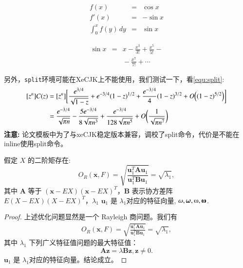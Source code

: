 \begin{eqnarray}
f(x) & = & \cos x \\ 
f'(x) & = & -\sin x \\ 
\int_{0}^{x} f(y)\,dy & = & \sin x 
\end{eqnarray} 

{\setlength\arraycolsep{2pt} 
\begin{eqnarray} 
\sin x & = & x -\frac{x^{3}}{3!} +\frac{x^{5}}{5!}-{} \nonumber\\ 
	& & {}-\frac{x^{7}}{7!}+{}\cdots 
\end{eqnarray}} 

另外，\texttt{split}环境可能在XeCJK上不能使用，我们测试一下，看\ref{equ:split}:
\begin{equation}\label{equ:split}
\begin{split}
[z^n]C(z) &= [z^n] \biggl[\frac{e^{3/4}}{\sqrt{1-z}} +
e^{-3/4}(1-z)^{1/2} + \frac{e^{-3/4}}{4}(1-z)^{3/2}
+ O\Bigl( (1-z)^{5/2}\Bigr)\biggr] \\
&= \frac{e^{-3/4}}{\sqrt{\pi n}} - \frac{5e^{-3/4}}{8\sqrt{\pi
n^3}} + \frac{e^{-3/4}}{128 \sqrt{\pi n^5}} +
O\biggl(\frac{1}{\sqrt{\pi
n^7}}\biggr)
\end{split}
\end{equation}
\textbf{注意:} 论文模板中为了与xeCJK稳定版本兼容，调校了split命令，代价是不能在inline使用split命令。

\begin{theorem}
  \label{chapTSthm:rayleigh solution}
  假定 $X$ 的二阶矩存在:
  \begin{equation}
         O_R(\textbf{x},F)=\sqrt{\frac{\textbf{u}_1^T\textbf{A}\textbf{u}_1} {\textbf{u}_1^T\textbf{B}\textbf{u}_1}}=\sqrt{\lambda_1},
  \end{equation}
  其中 $\textbf{A}$ 等于 $(\textbf{x}-EX)(\textbf{x}-EX)^T$，\textbf{B} 表示协方差阵 $E(X-EX)(X-EX)^T$，$\lambda_1$
$\textbf{u}_1$ 是 $\lambda_1$对应的特征向量, $\omega,\ve{\omega},\omegaup,\ve{\omegaup}$.
\end{theorem}

\begin{proof}
 上述优化问题显然是一个 Rayleigh 商问题。我们有
  \begin{align}
     O_R(\textbf{x},F)=\sqrt{\frac{\textbf{u}_1^T\textbf{A}\textbf{u}_1} {\textbf{u}_1^T\textbf{B}\textbf{u}_1}}=\sqrt{\lambda_1},
 \end{align}
 其中 $\lambda_1$ 下列广义特征值问题的最大特征值：
$$
\textbf{A}\textbf{z}=\lambda\textbf{B}\textbf{z}, \textbf{z}\neq 0.
$$
 $\textbf{u}_1$ 是 $\lambda_1$对应的特征向量。结论成立。
\end{proof}

